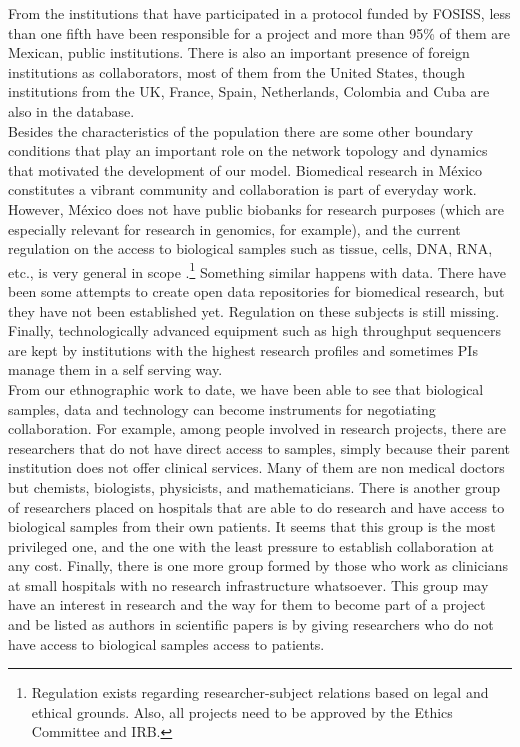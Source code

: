 \documentclass{bmcart}
\begin{document}
From the institutions that have participated in a protocol funded by FOSISS,
less than one fifth have been responsible for a project and more than 95\% of
them are Mexican, public institutions. There is also an important presence of
foreign institutions as collaborators, most of them from the United States,
though institutions from the UK, France, Spain, Netherlands, Colombia and Cuba
are also in the database.\\ 

Besides the characteristics of the population there are some other boundary
conditions that play an important role on the network topology and dynamics that
motivated the development of our model. Biomedical research in M\'exico
constitutes a vibrant community and collaboration is part of everyday
work. However, M\'exico does not have public biobanks for research purposes
(which are especially relevant for research in genomics, for example), and the
current regulation on the access to biological samples such as tissue,
cells, DNA, RNA, etc., is very general in scope 
{\color{red}\cite{Motta-Saruwatari:2016}}.\footnote{Regulation exists regarding
  researcher-subject relations based on legal and ethical grounds. Also, all
  projects need to be approved by the Ethics Committee and IRB.} Something
similar happens with data. There have been some attempts to create open data
repositories for biomedical research, but they have not been established
yet. Regulation on these subjects is still missing. Finally, technologically
advanced equipment such as high throughput sequencers are kept by institutions
with the highest research profiles and sometimes PIs manage them in a self serving way.\\

From our ethnographic work to date, we have been able to see that
biological samples, data and technology can become instruments for negotiating
collaboration. For example, among people involved in research projects, there
are researchers that do not have direct access to samples, simply because their
parent institution does not offer clinical services. Many of them are non medical
doctors but chemists, biologists, physicists, and mathematicians. There is
another group of researchers placed on hospitals that are able to do
research and have access to biological samples from their own patients. It seems
that this group is the most privileged one, and the one with the least pressure to establish
collaboration at any cost. Finally, there is one more group formed by those
who work as clinicians at small hospitals with no research infrastructure
whatsoever. This group may have an interest in research and the way for them to
become part of a project and be listed as authors in scientific papers is by
giving researchers who do not have access to biological samples access to
patients.\\
\end{document}
